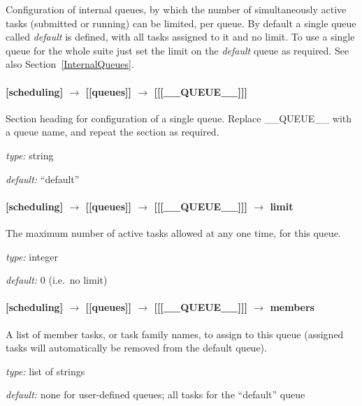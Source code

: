 Configuration of internal queues, by which the number of simultaneously
active tasks (submitted or running) can be limited, per queue. By
default a single queue called {\em default} is defined, with all tasks 
assigned to it and no limit. To use a single queue for the whole suite 
just set the limit on the {\em default} queue as required.
See also Section~\ref{InternalQueues}.

\paragraph[{[[[}\_\_QUEUE\_\_{]]]}]{[scheduling] $\rightarrow$ [[queues]] $\rightarrow$ [[[\_\_QUEUE\_\_]]]}

Section heading for configuration of a single queue. Replace
\_\_QUEUE\_\_ with a queue name, and repeat the section as required.

\begin{myitemize}
\item {\em type:} string
\item {\em default:} ``default''
\end{myitemize}

\paragraph[limit]{[scheduling] $\rightarrow$ [[queues]] $\rightarrow$ [[[\_\_QUEUE\_\_]]] $\rightarrow$ limit}

The maximum number of active tasks allowed at any one time, for this queue.
\begin{myitemize}
\item {\em type:} integer
\item {\em default:} 0 (i.e.\ no limit)
\end{myitemize}

\paragraph[members]{[scheduling] $\rightarrow$ [[queues]] $\rightarrow$ [[[\_\_QUEUE\_\_]]] $\rightarrow$ members}

A list of member tasks, or task family names, to assign to this queue
(assigned tasks will automatically be removed from the default queue).
\begin{myitemize}
\item {\em type:} list of strings
\item {\em default:} none for user-defined queues; all tasks for the ``default'' queue
\end{myitemize}

